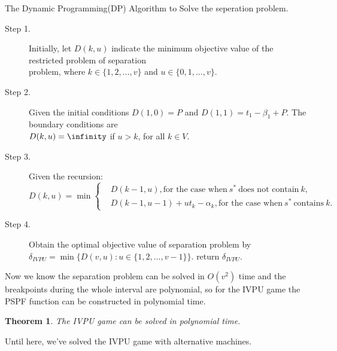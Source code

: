 \documentclass[UTF8]{article}
\newtheorem{thm}{\hspace{2em}Theorem}
\begin{document}
\begin{algorithm}[h]\label{algoDP}
\caption{The Dynamic Programming(DP) Algorithm to Solve the seperation problem.}
\begin{algorithmic}[1]


\begin{description}
  \item[Step 1.] Initially, let $D(k,u)$ indicate the minimum objective value of the restricted problem of separation \\
  \vspace{10pt}
  problem, where $k\in \{1,2,\ldots,v\}$ and $u\in \{0,1,\ldots,v\}$.
  \item[Step 2.] Given the initial conditions $D(1,0) = P$ and $D(1,1) = t_1 - \beta_1 +P$. The boundary conditions are \\
  \vspace{10pt}
  $D(k,u) = \infinity$ if $u > k$, for all $k \in V$.
  \item[Step 3.] Given the recursion:
  \begin{equation*}
  D(k,u)= \min \left\{
  \begin{aligned}
  & D(k-1,u), \text{for the case when} \ s^* \ \text{does not contain} \ k, \\
  & D(k-1,u-1) + u t_k - \alpha_k ,\text{for the case when} \ s^* \ \text{contains} \ k.
  \end{aligned}
  \right.
  \end{equation*}

  \item[Step 4.] Obtain the optimal objective value of separation problem by
  $\delta_{IVPU} = \min\{D(v,u): u\in \{1,2,\ldots,v-1\}\}$.
   return $\delta_{IVPU}$.
\end{description}

\end{algorithmic}
\end{algorithm}

Now we know the separation problem can be solved in $O(v^2)$ time and the breakpoints during the whole interval are polynomial, so for the IVPU game the PSPF function can be constructed in polynomial time.

\begin{thm}\label{thm6}
The IVPU game can be solved in polynomial time.
\end{thm}

Until here, we've solved the IVPU game with alternative machines.
\end{document}
